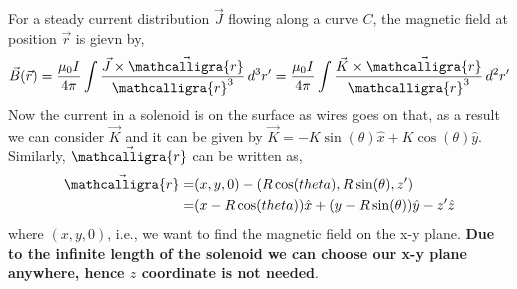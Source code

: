 \documentclass{article}
\newcommand{\scriptr}{\mathord{\mathcalligra{r}}}
\begin{document}
For a steady current distribution $\vec{J}$ flowing along a curve \(C\), the magnetic field at position $\vec{r}$ is gievn by,
\begin{equation}
\vec{B}(\vec{r})=\frac{\mu_0 I}{4\pi}\int \frac{\vec{J}\times \vec{\scriptr}}{\scriptr^3} \, d^3 r' = \frac{\mu_0 I}{4\pi}\int \frac{\vec{K}\times \vec{\scriptr}}{\scriptr^3}\, d^2 r'
\end{equation}
Now the current in a solenoid is on the surface as wires goes on that, as a result we can consider $\vec{K}$ and it can be given by $\vec{K}= -K \sin(\theta)\hat{x} + K \cos(\theta)\hat{y}$. Similarly, $\vec{\scriptr}$ can be written as,
\begin{equation*}
\begin{split}
    \vec{\scriptr} =& (x,y,0) - (R\cos(theta), R\sin(\theta), z')\\
                    =& (x-R\cos(theta))\hat{x}+(y-R\sin(\theta))\hat{y}-z' \hat{z}
\end{split}
\end{equation*}
where $(x,y,0)$, i.e., we want to find the magnetic field on the x-y plane. \textbf{Due to the infinite length of the solenoid we can choose our x-y plane anywhere, hence $z$ coordinate is not needed}.
\end{document}
